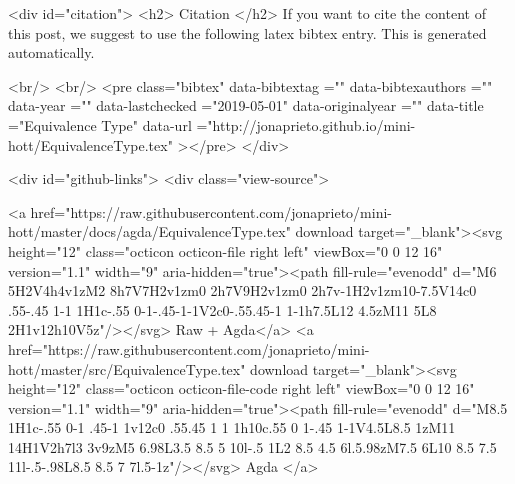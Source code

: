   
  <div id="citation">
  <h2> Citation </h2>
  If you want to cite the content of this post,
  we suggest to use the following latex bibtex entry.
  This is generated automatically.

  <br/>
  <br/>
  <pre class="bibtex"
       data-bibtextag =""
       data-bibtexauthors =""
       data-year =""
       data-lastchecked ="2019-05-01"
       data-originalyear =""
       data-title ="Equivalence Type"
       data-url ="http://jonaprieto.github.io/mini-hott/EquivalenceType.tex"
  ></pre>
  </div>
  

  <div id="github-links">
    <div class="view-source">
      
        <a href="https://raw.githubusercontent.com/jonaprieto/mini-hott/master/docs/agda/EquivalenceType.tex" download target="_blank"><svg height="12" class="octicon octicon-file right left" viewBox="0 0 12 16" version="1.1" width="9" aria-hidden="true"><path fill-rule="evenodd" d="M6 5H2V4h4v1zM2 8h7V7H2v1zm0 2h7V9H2v1zm0 2h7v-1H2v1zm10-7.5V14c0 .55-.45 1-1 1H1c-.55 0-1-.45-1-1V2c0-.55.45-1 1-1h7.5L12 4.5zM11 5L8 2H1v12h10V5z"/></svg> Raw + Agda</a>
        <a href="https://raw.githubusercontent.com/jonaprieto/mini-hott/master/src/EquivalenceType.tex" download target="_blank"><svg height="12" class="octicon octicon-file-code right left" viewBox="0 0 12 16" version="1.1" width="9" aria-hidden="true"><path fill-rule="evenodd" d="M8.5 1H1c-.55 0-1 .45-1 1v12c0 .55.45 1 1 1h10c.55 0 1-.45 1-1V4.5L8.5 1zM11 14H1V2h7l3 3v9zM5 6.98L3.5 8.5 5 10l-.5 1L2 8.5 4.5 6l.5.98zM7.5 6L10 8.5 7.5 11l-.5-.98L8.5 8.5 7 7l.5-1z"/></svg> Agda </a>
      
